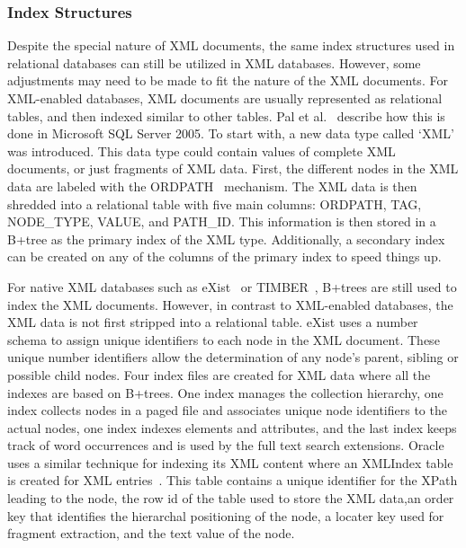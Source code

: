 \documentclass[12pt,a4paper]{article}
\begin{document}
\subsubsection{Index Structures}

Despite the special nature of XML documents, the same index structures used in relational databases can still be utilized in XML databases. However, some
adjustments may need to be made to fit the nature of the XML documents. For XML-enabled databases, XML documents are usually represented as relational tables,
and then indexed similar to other tables. Pal et al.~\cite{pal2004indexing} describe how this is done in Microsoft SQL Server 2005. To start with, a new data
type called `XML' was introduced. This data type could contain values of complete XML documents, or just fragments of XML data. First, the different nodes in
the XML data are labeled with the ORDPATH~\cite{o2004ordpaths} mechanism. The XML data is then shredded into a relational table with five main columns: ORDPATH,
TAG, NODE\_TYPE, VALUE, and PATH\_ID. This information is then stored in a B+tree as the primary index of the XML type. Additionally, a secondary index
can be created on any of the columns of the primary index to speed things up.


For native XML databases such as eXist~\cite{meier2009exist} or TIMBER~\cite{jagadish2002timber}, B+trees are still used to index the XML documents.
However, in contrast to XML-enabled databases, the XML data is not first stripped into a relational table. eXist uses a number schema to assign unique
identifiers to each node in the XML document. These unique number identifiers allow the determination of any node's parent, sibling or possible child nodes.
Four index files are created for XML data where all the indexes are based on B+trees. One index manages the collection hierarchy, one index collects nodes
in a paged file and associates unique node identifiers to the actual nodes, one index indexes elements and attributes, and the last index keeps track of word
occurrences and is used by the full text search extensions. Oracle uses a similar technique for indexing its XML content where an XMLIndex table is created for
XML entries~\cite{oracleXML}. This table contains a unique identifier for the XPath leading to the node, the row id of the table used to store the XML data,an
order key that identifies the hierarchal positioning of the node, a locater key used for fragment extraction, and the text value of the node.
\end{document}
